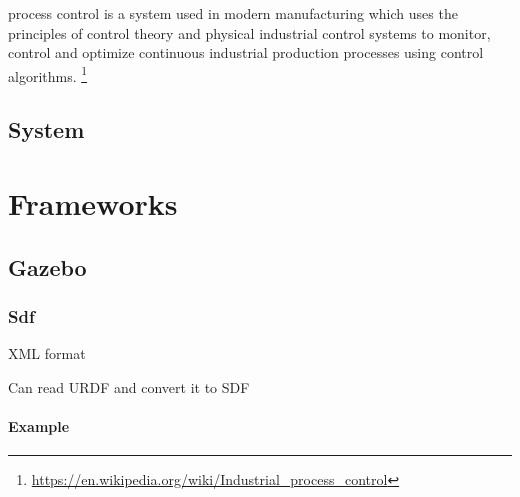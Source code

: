 \documentclass{book}
\providecommand{\seeherefooter}[1]{\footnote{\url{#1}}}
\begin{document}

process control is a system used in modern manufacturing which uses the principles of control theory and physical industrial control systems to monitor, control and optimize continuous industrial production processes using control algorithms. \seeherefooter{https://en.wikipedia.org/wiki/Industrial_process_control}

\subsection{System}


%

\section{Frameworks}

\subsection{Gazebo}

\subsubsection{Sdf}


XML format
    
    Can read URDF and convert it to SDF

\paragraph{Example}

\end{document}
